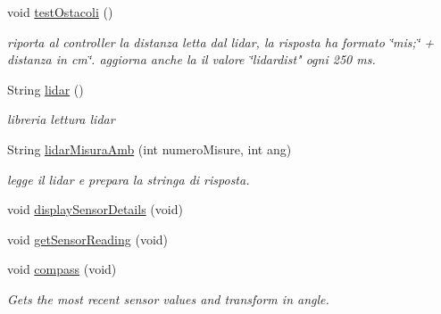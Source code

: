 \begin{DoxyCompactItemize}
\item 
void \mbox{\hyperlink{ari_pi__2_d_c__esp__08_8ino_a6f20cd3646bc1f8af9a4f9d5e45f5c90}{test\+Ostacoli}} ()
\begin{DoxyCompactList}\small\item\em riporta al controller la distanza letta dal lidar, la risposta ha formato \char`\"{}mis;\char`\"{} + distanza in cm\char`\"{}.
aggiorna anche la il valore \char`\"{}lidardist" ogni 250 ms. \end{DoxyCompactList}\item 
String \mbox{\hyperlink{ari_pi__2_d_c__esp__08_8ino_a23abf4b5bc87f963b0270c015e379872}{lidar}} ()
\begin{DoxyCompactList}\small\item\em libreria lettura lidar \end{DoxyCompactList}\item 
String \mbox{\hyperlink{ari_pi__2_d_c__esp__08_8ino_a0f6c65484953fd460fd89ee3a1a3825e}{lidar\+Misura\+Amb}} (int numero\+Misure, int ang)
\begin{DoxyCompactList}\small\item\em legge il lidar e prepara la stringa di risposta. \end{DoxyCompactList}\item 
void \mbox{\hyperlink{ari_pi__2_d_c__esp__08_8ino_ac3a1af41d00b96587bf75bad54078a1f}{display\+Sensor\+Details}} (void)
\item 
void \mbox{\hyperlink{ari_pi__2_d_c__esp__08_8ino_a5b51c469eb312609df7a037c33bde58d}{get\+Sensor\+Reading}} (void)
\item 
void \mbox{\hyperlink{ari_pi__2_d_c__esp__08_8ino_ada2502f03f6e1fe62fef80b03f317b98}{compass}} (void)
\begin{DoxyCompactList}\small\item\em Gets the most recent sensor values and transform in angle. \end{DoxyCompactList}\end{DoxyCompactItemize}
